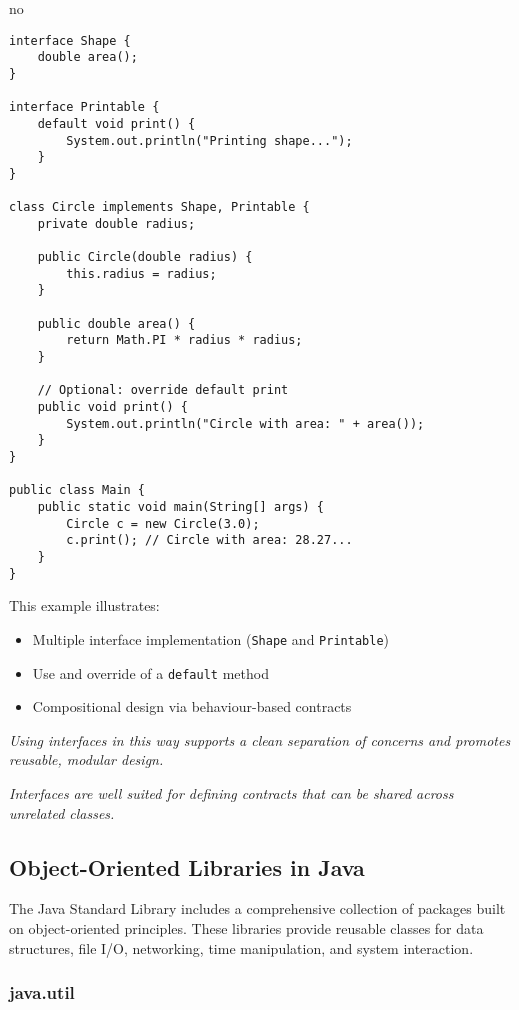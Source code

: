 no\documentclass{article}
\newcommand{\codecmd}[1]{\textcolor[rgb]{0,0.5,0}{\texttt{#1}}}
\begin{document}
\begin{verbatim}
interface Shape {
    double area();
}

interface Printable {
    default void print() {
        System.out.println("Printing shape...");
    }
}

class Circle implements Shape, Printable {
    private double radius;

    public Circle(double radius) {
        this.radius = radius;
    }

    public double area() {
        return Math.PI * radius * radius;
    }

    // Optional: override default print
    public void print() {
        System.out.println("Circle with area: " + area());
    }
}

public class Main {
    public static void main(String[] args) {
        Circle c = new Circle(3.0);
        c.print(); // Circle with area: 28.27...
    }
}
\end{verbatim}

This example illustrates:
\begin{itemize}
    \item Multiple interface implementation (\codecmd{Shape} and \codecmd{Printable})
    \item Use and override of a \codecmd{default} method
    \item Compositional design via behaviour-based contracts
\end{itemize}

\medskip
\textit{Using interfaces in this way supports a clean separation of concerns and promotes reusable, modular design.}


\medskip
\textit{Interfaces are well suited for defining contracts that can be shared across unrelated classes.}

\subsection{Object-Oriented Libraries in Java}

The Java Standard Library includes a comprehensive collection of packages built on object-oriented principles. These libraries provide reusable classes for data structures, file I/O, networking, time manipulation, and system interaction.

\subsubsection*{java.util}
\end{document}
